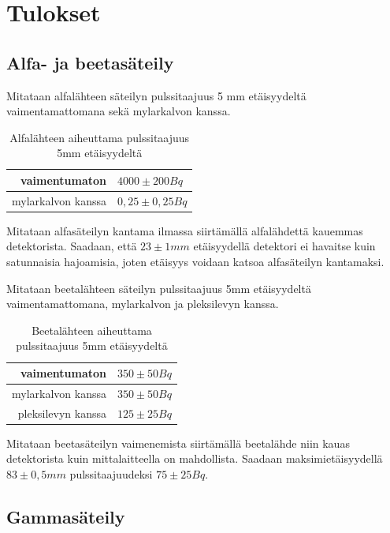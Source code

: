 \documentclass[a4paper,11pt]{article}
\begin{document}
\section{Tulokset}

\subsection{Alfa- ja beetasäteily}
\label{tulokset:alfabeeta}

Mitataan alfalähteen säteilyn pulssitaajuus 5 mm etäisyydeltä vaimentamattomana sekä mylarkalvon kanssa. 
\begin{table}[H]
\begin{center}
\caption{Alfalähteen aiheuttama pulssitaajuus 5mm etäisyydeltä}
\begin{tabular}{ | r | l | }
  \hline 
  vaimentumaton & $4000 \pm 200 Bq$ \\ \hline
  mylarkalvon kanssa & $0,25 \pm 0,25 Bq$ \\ \hline
\end{tabular}
\end{center}
\end{table}

Mitataan alfasäteilyn kantama ilmassa siirtämällä alfalähdettä kauemmas detektorista. Saadaan, että $23 \pm 1 mm$ etäisyydellä detektori ei havaitse kuin satunnaisia hajoamisia, joten etäisyys voidaan katsoa alfasäteilyn kantamaksi. 

Mitataan beetalähteen säteilyn pulssitaajuus 5mm etäisyydeltä vaimentamattomana, mylarkalvon ja pleksilevyn kanssa.
\begin{table}[H]
\begin{center}
\caption{Beetalähteen aiheuttama pulssitaajuus 5mm etäisyydeltä}
\begin{tabular}{ | r | l | }
  \hline
  vaimentumaton & $350 \pm 50 Bq$ \\ \hline
  mylarkalvon kanssa & $350 \pm 50 Bq$ \\ \hline
  pleksilevyn kanssa & $125 \pm 25 Bq$ \\ \hline
\end{tabular}
\end{center}
\end{table}
   
Mitataan beetasäteilyn vaimenemista siirtämällä beetalähde niin kauas detektorista kuin mittalaitteella on mahdollista. Saadaan maksimietäisyydellä $83 \pm 0,5 mm$ pulssitaajuudeksi $75 \pm 25 Bq$. 

\subsection{Gammasäteily}
\label{tulokset:gamma}
\end{document}
